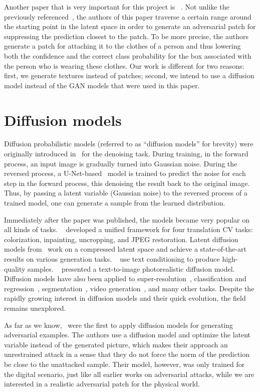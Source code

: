 Another paper that is very important for this project is ~\cite{dog_patch_clothes}.
Not unlike the previously referenced~\cite{clothes6, adv_gan_latent}, the authors of this paper traverse a certain range around the starting point in the latent space in order to generate an adversarial patch for suppressing the prediction closest to the patch.
To be more precise, the authors generate a patch for attaching it to the clothes of a person and thus lowering both the confidence and the correct class probability for the box associated with the person who is wearing these clothes.
Our work is different for two reasons: first, we generate textures instead of patches; second, we intend to use a diffusion model instead of the GAN models that were used in this paper.

\section{Diffusion models}
Diffusion probabilistic models (referred to as ``diffusion mo\-dels'' for brevity) were originally introduced in~\cite{diffusion} for the denoising task.
During training, in the forward process, an input image is gradually turned into Gaussian noise.
During the reversed process, a U-Net-based~\cite{unet} model is trained to predict the noise for each step in the forward process, this denoising the result back to the original image.
Thus, by passing a latent variable (Gaussian noise) to the reversed process of a trained model, one can generate a sample from the learned distribution.

Immediately after the paper was published, the models became very popular on all kinds of tasks.
~\cite{palette} developed a unified framework for four translation CV tasks: colorization, inpainting, uncropping, and JPEG restoration.
Latent diffusion models from~\cite{stable_dif} work on a compressed latent space and achieve a state-of-the-art results on various generation tasks.
~\cite{glide} use text conditioning to produce high-quality samples.
~\cite{text2im_dif} presented a text-to-image photorealistic diffusion model.
Diffusion models have also been applied to super-resolution~\cite{dif_sr, diff_den_sr}, classification and regression~\cite{dif_cl_reg}, segmentation~\cite{dif_seg, dif_med_seg}, video generation~\cite{dif_video, dif_video_long}, and many other tasks.
Despite the rapidly growing interest in diffusion models and their quick evolution, the field remains unexplored.

As far as we know,~\cite{adv_diffusion} were the first to apply diffusion models for generating adversarial examples.
The authors use a diffusion model and optimize the latent variable instead of the generated picture, which makes their approach an unrestrained attack in a sense that they do not force the norm of the prediction be close to the unattacked sample.
Their model, however, was only trained for the digital scenario, just like all earlier works on adversarial attacks, while we are interested in a realistic adversarial patch for the physical world.

